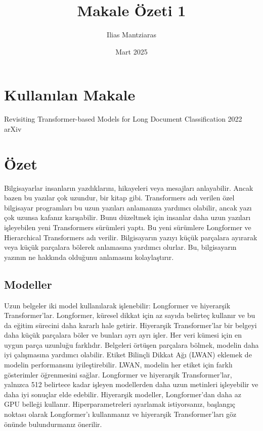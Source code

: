\documentclass{article}
\title{Makale Özeti 1}
\author{Ilias Mantziaras}
\date{Mart 2025}
\begin{document}
\maketitle

\section{Kullanılan Makale}
Revisiting Transformer-based Models for Long Document Classification 
2022 
arXiv

\section{Özet}
Bilgisayarlar insanların yazdıklarını, hikayeleri veya mesajları anlayabilir.
Ancak bazen bu yazılar çok uzundur, bir kitap gibi.
Transformers adı verilen özel bilgisayar programları bu uzun yazıları anlamanıza yardımcı olabilir, ancak yazı çok uzunsa kafanız karışabilir.
Bunu düzeltmek için insanlar daha uzun yazıları işleyebilen yeni Transformers sürümleri yaptı.
Bu yeni sürümlere Longformer ve Hierarchical Transformers adı verilir.
Bilgisayarın yazıyı küçük parçalara ayırarak veya küçük parçalara bölerek anlamasına yardımcı olurlar.
Bu, bilgisayarın yazının ne hakkında olduğunu anlamasını kolaylaştırır.

\subsection{Modeller}
Uzun belgeler iki model kullanılarak işlenebilir: Longformer ve hiyerarşik Transformer'lar.
Longformer, küresel dikkat için az sayıda belirteç kullanır ve bu da eğitim sürecini daha kararlı hale getirir.
Hiyerarşik Transformer'lar bir belgeyi daha küçük parçalara böler ve bunları ayrı ayrı işler.
Her veri kümesi için en uygun parça uzunluğu farklıdır.
Belgeleri örtüşen parçalara bölmek, modelin daha iyi çalışmasına yardımcı olabilir.
Etiket Bilinçli Dikkat Ağı (LWAN) eklemek de modelin performansını iyileştirebilir.
LWAN, modelin her etiket için farklı gösterimler öğrenmesini sağlar.
Longformer ve hiyerarşik Transformer'lar, yalnızca 512 belirtece kadar işleyen modellerden daha uzun metinleri işleyebilir ve daha iyi sonuçlar elde edebilir.
Hiyerarşik modeller, Longformer'dan daha az GPU belleği kullanır.
Hiperparametreleri ayarlamak istiyorsanız, başlangıç noktası olarak Longformer'ı kullanmanız ve hiyerarşik Transformer'ları göz önünde bulundurmanız önerilir.
\end{document}

